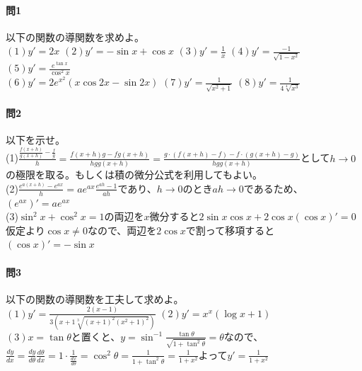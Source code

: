 \documentclass[a4j,dvipdfmx]{jsarticle}
\begin{document}
                \paragraph{問1}以下の関数の導関数を求めよ。\\
                $(1)y'=2x$\hspace{2mm}
                $(2)y'=-\sin x+\cos x$\hspace{2mm}
                $(3)y'=\frac{1}{x}$\hspace{2mm}
                $(4)y'=\frac{-1}{\sqrt{1-x^2}}$\hspace{2mm}
                $(5)y'=\frac{e^{\tan x}}{\cos^2 x}$\\
                $(6)y'=2e^{x^2}(x\cos2x-\sin 2x)$\hspace{3mm}
                $(7)y'=\frac{1}{\sqrt{x^2+1}}$\hspace{3mm}
                $(8)y'=\frac{1}{4\sqrt[4]{x^3}}$

                \paragraph{問2}以下を示せ。\\
                (1)$\displaystyle\frac{\frac{f(x+h)}{g(x+h)}-\frac{f}{g}}{h}=\frac{f(x+h)g-fg(x+h)}{hgg(x+h)}=\frac{g\cdot(f(x+h)-f)-f\cdot(g(x+h)-g)}{hgg(x+h)}$として$h\to0$の極限を取る。もしくは積の微分公式を利用してもよい。\\
                (2)$\displaystyle\frac{e^{a(x+h)}-e^{ax}}{h}=ae^{ax}\frac{e^{ah}-1}{ah}$であり、$h\to0$のとき$ah\to 0$であるため、$(e^{ax})'=ae^{ax}$\\
                (3)$\sin^2 x+\cos ^2 x=1$の両辺を$x$微分すると$2\sin x\cos x+2\cos x(\cos x)'=0$仮定より$\cos x\neq 0$なので、両辺を$2\cos x$で割って移項すると$(\cos x)'=-\sin x$

                \paragraph{問3}以下の関数の導関数を工夫して求めよ。\\
                $\displaystyle(1)y'=\frac{2(x-1)}{3(x+1\sqrt[3]{(x+1)^2(x^2+1)^2})}$\hspace{3mm}
                $(2)y'=x^x(\log x+1)$\\
                $(3)x=\tan \theta$と置くと、$\displaystyle y=\sin^{-1}\frac{\tan \theta}{\sqrt{1+\tan^2\theta}}=\theta$なので、\\
                $\displaystyle \frac{dy}{dx}=\frac{dy}{d\theta}\frac{d\theta}{dx}=1\cdot\frac{1}{\frac{dx}{d\theta}}=\cos^2 \theta=\frac{1}{1+\tan^2\theta}=\frac{1}{1+x^2}$よって$\displaystyle y'=\frac{1}{1+x^2}$
\end{document}

